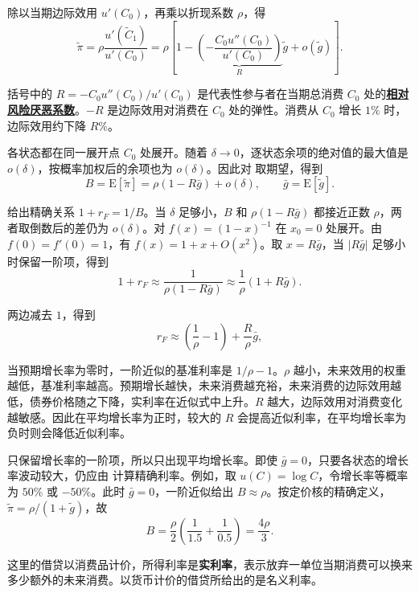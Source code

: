 除以当期边际效用 $u'(C_0)$，再乘以折现系数 $\rho$，得
\begin{equation}
 \widetilde\pi=\rho\frac{u'(\widetilde C_1)}{u'(C_0)}
 =\rho\left[1-
 \underbrace{\left(-\frac{C_0u''(C_0)}{u'(C_0)}\right)}_{R}
 \tilde g+o(\tilde g)\right].
 \label{eq:wj-10-23}
\end{equation}

括号中的 $R=-C_0u''(C_0)/u'(C_0)$ 是代表性参与者在当期总消费 $C_0$ 处的\hyperlink{wj-relative-risk-aversion}{\textcolor{WJReferenceColor}{\textbf{相对风险厌恶系数}}}。$-R$ 是边际效用对消费在 $C_0$ 处的弹性。消费从 $C_0$ 增长 $1\%$ 时，边际效用约下降 $R\%$。

各状态都在同一展开点 $C_0$ 处展开。随着 $\delta\to0$，逐状态余项的绝对值的最大值是 $o(\delta)$，按概率加权后的余项也为 $o(\delta)$。因此对 取期望，得到
\[
 B=\mathrm E[\widetilde\pi]
 =\rho(1-R\bar g)+o(\delta),\qquad \bar g=\mathrm E[\tilde g].
\]

 给出精确关系 $1+r_F=1/B$。当 $\delta$ 足够小，$B$ 和 $\rho(1-R\bar g)$ 都接近正数 $\rho$，两者取倒数后的差仍为 $o(\delta)$。对 $f(x)=(1-x)^{-1}$ 在 $x_0=0$ 处展开。由 $f(0)=f'(0)=1$，有 $f(x)=1+x+O(x^2)$。取 $x=R\bar g$，当 $\lvert R\bar g\rvert$ 足够小时保留一阶项，得到
\[
 1+r_F\approx\frac{1}{\rho(1-R\bar g)}
 \approx\frac{1}{\rho}(1+R\bar g).
\]

两边减去 $1$，得到
\begin{equation}
 r_F\approx\left(\frac1\rho-1\right)+\frac R\rho\bar g,
 \label{eq:wj-10-24}
\end{equation}

当预期增长率为零时，一阶近似的基准利率是 $1/\rho-1$。$\rho$ 越小，未来效用的权重越低，基准利率越高。预期增长越快，未来消费越充裕，未来消费的边际效用越低，债券价格随之下降，实利率在近似式中上升。$R$ 越大，边际效用对消费变化越敏感。因此在平均增长率为正时，较大的 $R$ 会提高近似利率，在平均增长率为负时则会降低近似利率。

 只保留增长率的一阶项，所以只出现平均增长率。即使 $\bar g=0$，只要各状态的增长率波动较大，仍应由 计算精确利率。例如，取 $u(C)=\log C$，令增长率等概率为 $50\%$ 或 $-50\%$。此时 $\bar g=0$，一阶近似给出 $B\approx\rho$。按定价核的精确定义，$\widetilde\pi=\rho/(1+\tilde g)$，故
\[
 B=\frac{\rho}{2}\left(\frac{1}{1.5}+\frac{1}{0.5}\right)=\frac{4\rho}{3}.
\]

这里的借贷以消费品计价，所得利率是\textbf{实利率}，表示放弃一单位当期消费可以换来多少额外的未来消费。以货币计价的借贷所给出的是名义利率。

